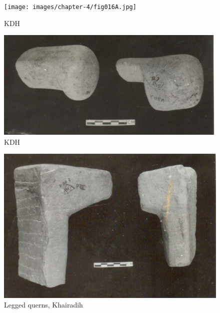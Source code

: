 
\begin{figure}[H]
\renewcommand{\thefigure}{16A}
\texttt{[image: images/chapter-4/fig016A.jpg]}
\caption{KDH}\label{chapter-4-fig16A}
\end{figure}

\newpage

\begin{figure}[H]
\renewcommand{\thefigure}{16B}
\includegraphics[scale=0.6]{images/chapter-4/fig016B.jpg}
\caption{KDH}\label{chapter-4-fig16B}
\end{figure}


\begin{figure}[H]
\renewcommand{\thefigure}{16C}
\includegraphics[scale=0.75]{images/chapter-4/fig016C.jpg}
\caption{Legged querns, Khairadih}\label{chapter-4-fig16C}
\end{figure}
\vspace{-.5cm}

